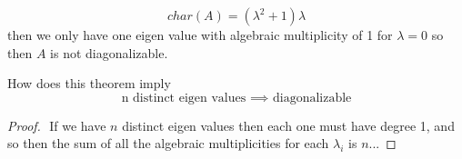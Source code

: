 \documentclass[11pt]{book}
\begin{document}
\begin{eg}
    \[
        char\left(A\right) = \left( \lambda ^2  + 1 \right) \lambda 
    \]
    then we only have one eigen value with algebraic multiplicity of 1 for $\lambda = 0$ so then $A$ is not diagonalizable. 
\end{eg}

\begin{eg}
    How does this theorem imply 
    \[
    \text{ n distinct eigen values  } \implies \text{ diagonalizable  } 
    \]
    \begin{proof}
    $ $\newline
        If we have $n$ distinct eigen values then each one must have degree 1, and so then the sum of all the algebraic multiplicities for each $\lambda _{i} $ is $n$...  
    \end{proof}
\end{eg}
\end{document}

